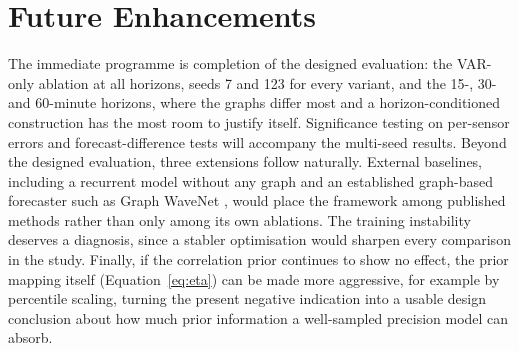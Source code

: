 \documentclass[MTech]{ugthesis}
\begin{document}
\section{Future Enhancements}
The immediate programme is completion of the designed evaluation: the VAR-only ablation at all horizons, seeds 7 and 123 for every variant, and the 15-, 30- and 60-minute horizons, where the graphs differ most and a horizon-conditioned construction has the most room to justify itself. Significance testing on per-sensor errors and forecast-difference tests will accompany the multi-seed results. Beyond the designed evaluation, three extensions follow naturally. External baselines, including a recurrent model without any graph and an established graph-based forecaster such as Graph WaveNet \citep{wu2019graphwavenet}, would place the framework among published methods rather than only among its own ablations. The training instability deserves a diagnosis, since a stabler optimisation would sharpen every comparison in the study. Finally, if the correlation prior continues to show no effect, the prior mapping itself (Equation~\eqref{eq:eta}) can be made more aggressive, for example by percentile scaling, turning the present negative indication into a usable design conclusion about how much prior information a well-sampled precision model can absorb.

\begin{singlespace}
\end{singlespace}
\appendix
\end{document}
